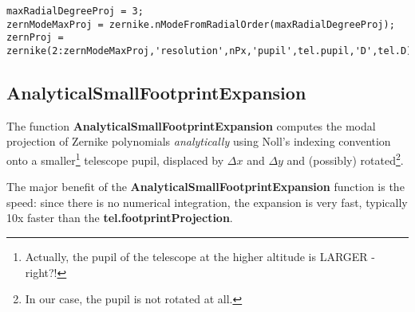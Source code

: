 \documentclass[a4paper,11pt]{book}
\begin{document}
\begin{verbatim}
maxRadialDegreeProj = 3;
zernModeMaxProj = zernike.nModeFromRadialOrder(maxRadialDegreeProj);
zernProj = zernike(2:zernModeMaxProj,'resolution',nPx,'pupil',tel.pupil,'D',tel.D);
\end{verbatim}

% 


\subsection{AnalyticalSmallFootprintExpansion}
The function \textbf{AnalyticalSmallFootprintExpansion} computes the modal projection of Zernike polynomials \textit{analytically} using Noll's indexing convention onto a smaller\footnote{Actually, the pupil of the telescope at the higher altitude is LARGER - right?!} telescope pupil, displaced by $\Delta x$ and $\Delta y$ and (possibly) rotated\footnote{In our case, the pupil is not rotated at all.}.

The major benefit of the \textbf{AnalyticalSmallFootprintExpansion} function is the speed: since there is no numerical integration, the expansion is very fast, typically 10x faster than the \textbf{tel.footprintProjection}.
\end{document}
